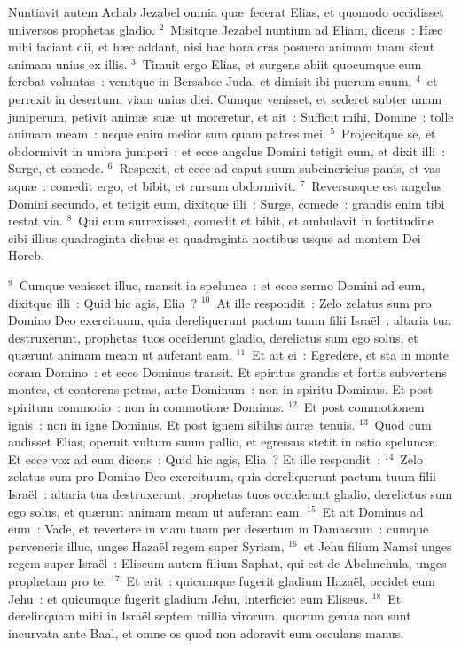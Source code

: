 \bchapter
\lettrine[lines=3,image=true,loversize=0.05,lraise=-0.03]{N}{}untiavit autem Achab Jezabel omnia qu\ae\ fecerat Elias, et quomodo occidisset universos prophetas gladio.
${}^{2}$~Misitque Jezabel nuntium ad Eliam, dicens~: H\ae c mihi faciant dii, et h\ae c addant, nisi hac hora cras posuero animam tuam sicut animam unius ex illis.
${}^{3}$~Timuit ergo Elias, et surgens abiit quocumque eum ferebat voluntas~: venitque in Bersabee Juda, et dimisit ibi puerum suum,
${}^{4}$~et perrexit in desertum, viam unius diei. Cumque venisset, et sederet subter unam juniperum, petivit anim\ae\ su\ae\ ut moreretur, et ait~: Sufficit mihi, Domine~: tolle animam meam~: neque enim melior sum quam patres mei.
${}^{5}$~Projecitque se, et obdormivit in umbra juniperi~: et ecce angelus Domini tetigit eum, et dixit illi~: Surge, et comede.
${}^{6}$~Respexit, et ecce ad caput suum subcinericius panis, et vas aqu\ae~: comedit ergo, et bibit, et rursum obdormivit.
${}^{7}$~Reversusque est angelus Domini secundo, et tetigit eum, dixitque illi~: Surge, comede~: grandis enim tibi restat via.
${}^{8}$~Qui cum surrexisset, comedit et bibit, et ambulavit in fortitudine cibi illius quadraginta diebus et quadraginta noctibus usque ad montem Dei Horeb.


${}^{9}$~Cumque venisset illuc, mansit in spelunca~: et ecce sermo Domini ad eum, dixitque illi~: Quid hic agis, Elia~?
${}^{10}$~At ille respondit~: Zelo zelatus sum pro Domino Deo exercituum, quia dereliquerunt pactum tuum filii Isra\"el~: altaria tua destruxerunt, prophetas tuos occiderunt gladio, derelictus sum ego solus, et qu\ae runt animam meam ut auferant eam.
${}^{11}$~Et ait ei~: Egredere, et sta in monte coram Domino~: et ecce Dominus transit. Et spiritus grandis et fortis subvertens montes, et conterens petras, ante Dominum~: non in spiritu Dominus. Et post spiritum commotio~: non in commotione Dominus.
${}^{12}$~Et post commotionem ignis~: non in igne Dominus. Et post ignem sibilus aur\ae\ tenuis.
${}^{13}$~Quod cum audisset Elias, operuit vultum suum pallio, et egressus stetit in ostio spelunc\ae . Et ecce vox ad eum dicens~: Quid hic agis, Elia~? Et ille respondit~:
${}^{14}$~Zelo zelatus sum pro Domino Deo exercituum, quia dereliquerunt pactum tuum filii Isra\"el~: altaria tua destruxerunt, prophetas tuos occiderunt gladio, derelictus sum ego solus, et qu\ae runt animam meam ut auferant eam.
${}^{15}$~Et ait Dominus ad eum~: Vade, et revertere in viam tuam per desertum in Damascum~: cumque perveneris illuc, unges Haza\"el regem super Syriam,
${}^{16}$~et Jehu filium Namsi unges regem super Isra\"el~: Eliseum autem filium Saphat, qui est de Abelmehula, unges prophetam pro te.
${}^{17}$~Et erit~: quicumque fugerit gladium Haza\"el, occidet eum Jehu~: et quicumque fugerit gladium Jehu, interficiet eum Eliseus.
${}^{18}$~Et derelinquam mihi in Isra\"el septem millia virorum, quorum genua non sunt incurvata ante Baal, et omne os quod non adoravit eum osculans manus.


